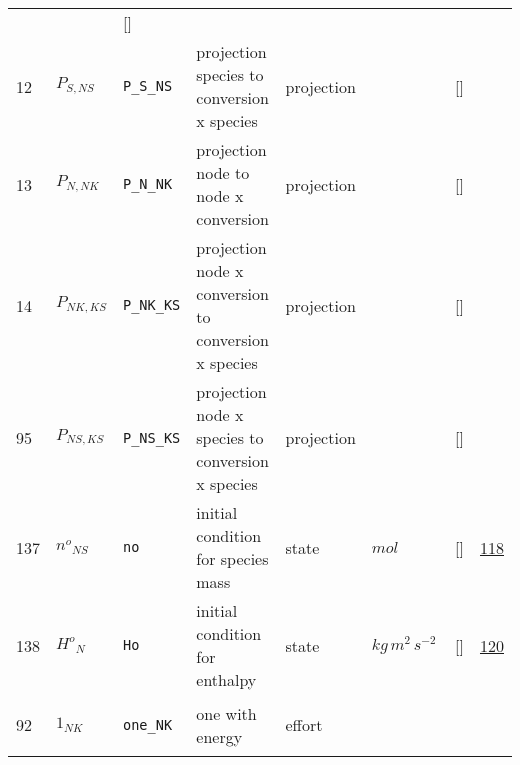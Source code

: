 \begin{longtable}{|p{1cm}|p{3cm}|p{3cm}|p{7cm}|p{3.0cm}|p{3cm}|p{2cm}|p{1cm}|}
             & $  $
             & []
             & \\
    12
             & \hypertarget{"v:12"}{ $ {P}_{S, {N S}} $}
             & \verb|P_S_NS|
             & projection species to conversion x
species
             & \begin{lay}projection \end{lay}
             & $  $
             & []
             & \\
    13
             & \hypertarget{"v:13"}{ $ {P}_{N, {N K}} $}
             & \verb|P_N_NK|
             & projection node to node x conversion
             & \begin{lay}projection \end{lay}
             & $  $
             & []
             & \\
    14
             & \hypertarget{"v:14"}{ $ {P}_{{N K}, {K S}} $}
             & \verb|P_NK_KS|
             & projection node x conversion to conversion x
species
             & \begin{lay}projection \end{lay}
             & $  $
             & []
             & \\
    95
             & \hypertarget{"v:95"}{ $ {P}_{{N S}, {K S}} $}
             & \verb|P_NS_KS|
             & projection node x species to conversion x
species
             & \begin{lay}projection \end{lay}
             & $  $
             & []
             & \\
    137
             & \hypertarget{"v:137"}{ $ {n^{o}}_{{N S}} $}
             & \verb|no|
             & initial condition for species mass
             & \begin{lay}state \end{lay}
             & $ mol \, $
             & []
             & \hyperlink{"e:118"}{ 118 }
                 \\
    138
             & \hypertarget{"v:138"}{ $ {H^{o}}_{N} $}
             & \verb|Ho|
             & initial condition for enthalpy
             & \begin{lay}state \end{lay}
             & $ kg \,m^{2} \,s^{-2} \, $
             & []
             & \hyperlink{"e:120"}{ 120 }
                 \\
    92
             & \hypertarget{"v:92"}{ $ {1}_{{N K}} $}
             & \verb|one_NK|
             & one with energy
             & \begin{lay}effort \end{lay}

\end{longtable}
